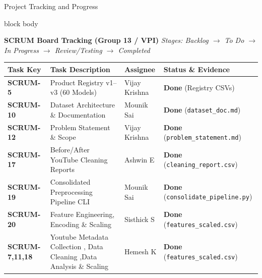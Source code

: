 \documentclass[aspectratio=169, 10pt]{beamer}
\newenvironment{card}[1][]{%
    \begin{beamercolorbox}[rounded=true,shadow=false,wd=\linewidth,sep=4pt,#1]{block body}%
}{%
    \end{beamercolorbox}%
}
\begin{document}
\begin{frame}{Project Tracking and Progress}
    \vspace{-0.1cm}
    \begin{card}
        {\fontsize{8pt}{9.5pt}\selectfont \textbf{SCRUM Board Tracking (Group 13 / VPI)} \hfill \textit{Stages: Backlog $\rightarrow$ To Do $\rightarrow$ In Progress $\rightarrow$ Review/Testing $\rightarrow$ Completed}}
        \vspace{0.06cm}
        \scriptsize
        \begin{tabular}{p{1.7cm}p{4.2cm}p{2.3cm}p{3.2cm}}
            \toprule
            \textbf{Task Key} & \textbf{Task Description} & \textbf{Assignee} & \textbf{Status \& Evidence} \\
            \midrule
            \textbf{SCRUM-5}  & Product Registry v1--v3 (60 Models) & Vijay Krishna & \textcolor{EmeraldGreen}{\textbf{Done}} (Registry CSVs) \\
            \textbf{SCRUM-10} & Dataset Architecture \& Documentation & Mounik Sai & \textcolor{EmeraldGreen}{\textbf{Done}} (\texttt{dataset\_doc.md}) \\
            \textbf{SCRUM-12} & Problem Statement \& Scope & Vijay Krishna & \textcolor{EmeraldGreen}{\textbf{Done}} (\texttt{problem\_statement.md}) \\
            \textbf{SCRUM-17} & Before/After YouTube Cleaning Reports & Ashwin E & \textcolor{EmeraldGreen}{\textbf{Done}} (\texttt{cleaning\_report.csv}) \\
            \textbf{SCRUM-19} & Consolidated Preprocessing Pipeline CLI & Mounik Sai & \textcolor{EmeraldGreen}{\textbf{Done}} (\texttt{consolidate\_pipeline.py}) \\
            \textbf{SCRUM-20} & Feature Engineering, Encoding \& Scaling & Sisthick S & \textcolor{EmeraldGreen}{\textbf{Done}} (\texttt{features\_scaled.csv}) \\
             \textbf{SCRUM-7,11,18} & Youtube Metadata Collection , Data Cleaning ,Data Analysis  \& Scaling & Hemesh K & \textcolor{EmeraldGreen}{\textbf{Done}} (\texttt{features\_scaled.csv}) \\
            \bottomrule
        \end{tabular}
    \end{card}
    \vspace{0.12cm}


\end{frame}
\end{document}
